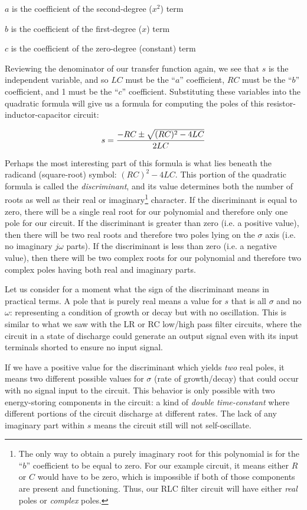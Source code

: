 $a$ is the coefficient of the second-degree ($x^2$) term

$b$ is the coefficient of the first-degree ($x$) term

$c$ is the coefficient of the zero-degree (constant) term

\vskip 10pt

Reviewing the denominator of our transfer function again, we see that $s$ is the independent variable, and so $LC$ must be the ``$a$'' coefficient, $RC$ must be the ``$b$'' coefficient, and 1 must be the ``$c$'' coefficient.  Substituting these variables into the quadratic formula will give us a formula for computing the poles of this resistor-inductor-capacitor circuit:

$$s = {{-RC \pm \sqrt{(RC)^2 - 4LC}} \over 2LC}$$ 

Perhaps the most interesting part of this formula is what lies beneath the radicand (square-root) symbol: $(RC)^2 - 4LC$.  This portion of the quadratic formula is called the \textit{discriminant}, and its value determines both the number of roots as well as their real or imaginary\footnote{The only way to obtain a purely imaginary root for this polynomial is for the ``$b$'' coefficient to be equal to zero.  For our example circuit, it means either $R$ or $C$ would have to be zero, which is impossible if both of those components are present and functioning.  Thus, our RLC filter circuit will have either \textit{real} poles or \textit{complex} poles.} character.  If the discriminant is equal to zero, there will be a single real root for our polynomial and therefore only one pole for our circuit.  If the discriminant is greater than zero (i.e. a positive value), then there will be two real roots and therefore two poles lying on the $\sigma$ axis (i.e. no imaginary $j \omega$ parts).  If the discriminant is less than zero (i.e. a negative value), then there will be two complex roots for our polynomial and therefore two complex poles having both real and imaginary parts.

Let us consider for a moment what the sign of the discriminant means in practical terms.  A pole that is purely real means a value for $s$ that is all $\sigma$ and no $\omega$: representing a condition of growth or decay but with no oscillation.  This is similar to what we saw with the LR or RC low/high pass filter circuits, where the circuit in a state of discharge could generate an output signal even with its input terminals shorted to ensure no input signal.  

If we have a positive value for the discriminant which yields \textit{two} real poles, it means two different possible values for $\sigma$ (rate of growth/decay) that could occur with no signal input to the circuit.  This behavior is only possible with two energy-storing components in the circuit: a kind of \textit{double time-constant} where different portions of the circuit discharge at different rates.  The lack of any imaginary part within $s$ means the circuit still will not self-oscillate.

